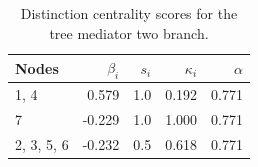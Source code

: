 \begin{table}
\centering
\caption{\label{tab:treemediator2}Distinction centrality scores for the tree mediator two branch.}
\centering
\begin{tabular}[t]{lrrrr}
\toprule
Nodes & $\beta_i$ & $s_i$ & $\kappa_i$ & $\alpha$\\
\midrule
1, 4 & 0.579 & 1.0 & 0.192 & 0.771\\
7 & -0.229 & 1.0 & 1.000 & 0.771\\
2, 3, 5, 6 & -0.232 & 0.5 & 0.618 & 0.771\\
\bottomrule
\end{tabular}
\end{table}
